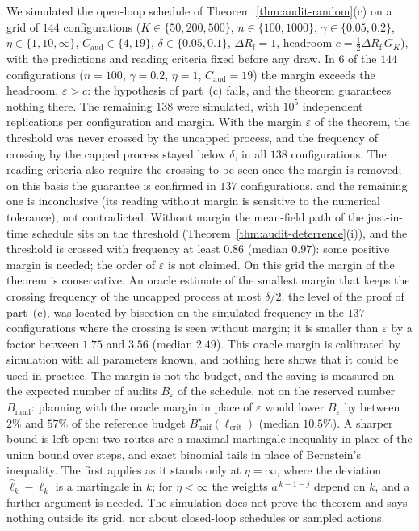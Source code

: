 \begin{remark}\label{rem:audit-random-sim}
We simulated the open-loop schedule of Theorem~\ref{thm:audit-random}(c) on a grid of $144$ configurations ($K\in\{50,200,500\}$, $n\in\{100,1000\}$, $\gamma\in\{0.05,0.2\}$, $\eta\in\{1,10,\infty\}$, $C_{\mathrm{aud}}\in\{4,19\}$, $\delta\in\{0.05,0.1\}$, $\Delta R_{\mathrm f}=1$, headroom $c=\tfrac12\Delta R_{\mathrm f}\,G_K$), with the predictions and reading criteria fixed before any draw. In $6$ of the $144$ configurations ($n=100$, $\gamma=0.2$, $\eta=1$, $C_{\mathrm{aud}}=19$) the margin exceeds the headroom, $\varepsilon>c$: the hypothesis of part~(c) fails, and the theorem guarantees nothing there. The remaining $138$ were simulated, with $10^5$ independent replications per configuration and margin. With the margin $\varepsilon$ of the theorem, the threshold was never crossed by the uncapped process, and the frequency of crossing by the capped process stayed below $\delta$, in all $138$ configurations. The reading criteria also require the crossing to be seen once the margin is removed; on this basis the guarantee is confirmed in $137$ configurations, and the remaining one is inconclusive (its reading without margin is sensitive to the numerical tolerance), not contradicted. Without margin the mean-field path of the just-in-time schedule sits on the threshold (Theorem~\ref{thm:audit-deterrence}(i)), and the threshold is crossed with frequency at least $0.86$ (median $0.97$): some positive margin is needed; the order of $\varepsilon$ is not claimed. On this grid the margin of the theorem is conservative. An oracle estimate of the smallest margin that keeps the crossing frequency of the uncapped process at most $\delta/2$, the level of the proof of part~(c), was located by bisection on the simulated frequency in the $137$ configurations where the crossing is seen without margin; it is smaller than $\varepsilon$ by a factor between $1.75$ and $3.56$ (median $2.49$). This oracle margin is calibrated by simulation with all parameters known, and nothing here shows that it could be used in practice. The margin is not the budget, and the saving is measured on the expected number of audits $B_\varepsilon$ of the schedule, not on the reserved number $B_{\mathrm{rand}}$: planning with the oracle margin in place of $\varepsilon$ would lower $B_\varepsilon$ by between $2\%$ and $57\%$ of the reference budget $B^\star_{\mathrm{unif}}(\ell_{\mathrm{crit}})$ (median $10.5\%$). A sharper bound is left open; two routes are a maximal martingale inequality in place of the union bound over steps, and exact binomial tails in place of Bernstein's inequality. The first applies as it stands only at $\eta=\infty$, where the deviation $\hat\ell_k-\ell_k$ is a martingale in $k$; for $\eta<\infty$ the weights $a^{\,k-1-j}$ depend on $k$, and a further argument is needed. The simulation does not prove the theorem and says nothing outside its grid, nor about closed-loop schedules or sampled actions.
\end{remark}

